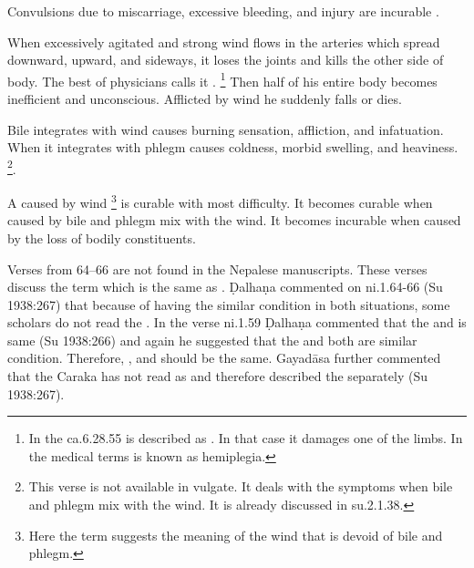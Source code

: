\begin{translation}
\item[59] Convulsions due to miscarriage, excessive bleeding, and injury are incurable .

\item[60--62] When excessively agitated and strong wind flows in the arteries which spread downward, upward, and sideways, it loses the joints and kills the other side of body. The best of physicians calls it . \footnote{In the ca.6.28.55  is described as . In that case it damages one of the limbs.  In the medical terms  is known as hemiplegia.} Then half of his entire body becomes inefficient and unconscious. Afflicted by wind he suddenly falls or dies.

\item[62.1] Bile integrates with wind causes burning sensation, affliction, and infatuation. When it integrates with phlegm causes coldness, morbid swelling, and heaviness. \footnote{This verse is not available in vulgate. It deals with the symptoms when bile and phlegm mix with the wind. It is already discussed in su.2.1.38.}. 

\item[63] A  caused by wind \footnote{Here the term  suggests the meaning of the wind that is devoid of bile and phlegm.} is curable with most difficulty. It becomes curable when caused by bile and phlegm mix with the wind. It becomes incurable when caused by the loss of bodily constituents.

\item[64--66] Verses from 64--66 are not found in the Nepalese manuscripts. These verses discuss the term  which is the same as . Ḍalhaṇa commented on ni.1.64-66 (Su 1938:267) that because of having the similar condition in both situations, some scholars do not read the . In the verse ni.1.59 Ḍalhaṇa commented that the  and  is same (Su 1938:266) and again he suggested that the  and  both are similar condition. Therefore, ,  and  should be the same. Gayadāsa further commented that the Caraka has not read  as  and therefore described the  separately (Su 1938:267).


\end{translation}
